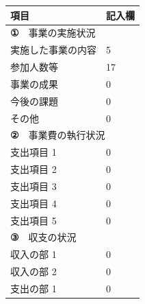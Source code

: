 \documentclass[UTF8,10pt,a4paper,fontset=fandol]{ctexart}
\newcommand{\fieldvalue}[1]{#1}
\newcommand{\handwritten}[1]{#1}
\begin{document}
\begin{tabularx}{\textwidth}{|X|p{}|}
\hline
\centering 項目 & \centering 記入欄\arraybackslash\\
\hline
\multicolumn{2}{|l|}{\textbf{①}　事業の実施状況}\\
\hline
実施した事業の内容 & 
\fieldvalue{\handwritten{5}}\\
\hline
参加人数等 &
\fieldvalue{\handwritten{17}}\\
\hline
事業の成果 &
\fieldvalue{\handwritten{0}}\\
\hline
今後の課題 &
\fieldvalue{\handwritten{0}}\\
\hline
その他 &
\fieldvalue{\handwritten{0}}\\
\hline
\multicolumn{2}{|l|}{\textbf{②}　事業費の執行状況}\\
\hline
支出項目 1 &
\fieldvalue{\handwritten{0}}\\
\hline
支出項目 2 &
\fieldvalue{\handwritten{0}}\\
\hline
支出項目 3 &
\fieldvalue{\handwritten{0}}\\
\hline
支出項目 4 &
\fieldvalue{\handwritten{0}}\\
\hline
支出項目 5 &
\fieldvalue{\handwritten{0}}\\
\hline
\multicolumn{2}{|l|}{\textbf{③}　収支の状況}\\
\hline
収入の部 1 &
\fieldvalue{\handwritten{0}}\\
\hline
収入の部 2 &
\fieldvalue{\handwritten{0}}\\
\hline
支出の部 1 &
\fieldvalue{\handwritten{0}}\\

\end{tabularx}
\end{document}
